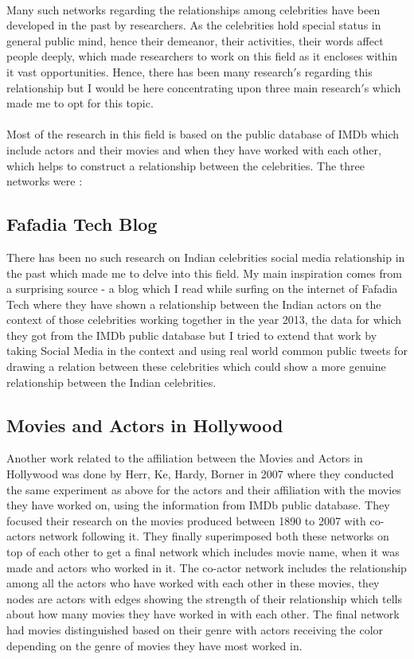 \documentclass[runningheads,a4paper]{llncs}
\begin{document}
\paragraph{}
Many such networks regarding the relationships among celebrities have been developed in the past by researchers. As the celebrities hold special status in general public mind, hence their demeanor, their activities, their words affect people deeply, which made researchers to work on this field as it encloses within it vast opportunities. Hence, there has been many research$'$s regarding this relationship but I would be here concentrating upon three main research$'$s which made me to opt for this topic.
\paragraph{}
Most of the research in this field is based on the public database of IMDb which include actors and their movies and when they have worked with each other, which helps to construct a relationship between the celebrities. The three networks were : 
\subsection{Fafadia Tech Blog}
There has been no such research on Indian celebrities social media relationship in the past which made me to delve into this field. My main inspiration comes from a surprising source - a blog which I read while surfing on the internet of Fafadia Tech \cite{fafadia} where they have shown a relationship between the Indian actors on the context of those celebrities working together in the year 2013, the data for which they got from the IMDb public database but I tried to extend that work by taking Social Media in the context and using real world common public tweets for drawing a relation between these celebrities which could show a more genuine relationship between the Indian celebrities.
\subsection{Movies and Actors in Hollywood}
Another work related to the affiliation between the Movies and Actors in Hollywood was done by Herr, Ke, Hardy, Borner in 2007 \cite{1} where they conducted the same experiment as above for the actors and their affiliation with the movies they have worked on, using the information from IMDb public database. They focused their research on the movies produced between 1890 to 2007 with co-actors network following it. They finally superimposed both these networks on top of each other to get a final network which includes movie name, when it was made and actors who worked in it. The co-actor network includes the relationship among all the actors who have worked with each other in these movies, they nodes are actors with edges showing the strength of their relationship which tells about how many movies they have worked in with each other. The final network had movies distinguished based on their genre with actors receiving the color depending on the genre of movies they have most worked in.
\end{document}
